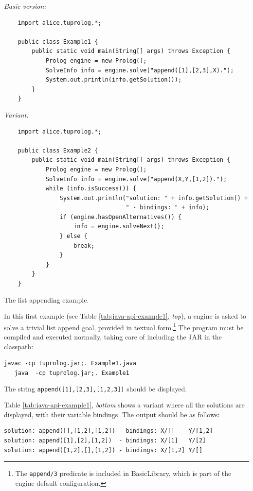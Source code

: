 \begin{table}
\textit{Basic version:}
{\small{
\begin{verbatim}
    import alice.tuprolog.*;

    public class Example1 {
        public static void main(String[] args) throws Exception {
            Prolog engine = new Prolog();
            SolveInfo info = engine.solve("append([1],[2,3],X).");
            System.out.println(info.getSolution());
        }
    }
\end{verbatim}
}}
\textit{Variant:}
{\small{
\begin{verbatim}
    import alice.tuprolog.*;

    public class Example2 {
        public static void main(String[] args) throws Exception {
            Prolog engine = new Prolog();
            SolveInfo info = engine.solve("append(X,Y,[1,2]).");
            while (info.isSuccess()) {
                System.out.println("solution: " + info.getSolution() +
                                   " - bindings: " + info);
                if (engine.hasOpenAlternatives()) {
                    info = engine.solveNext();
                } else {
                    break;
                }
            }
        }
    }
\end{verbatim}
}}
\caption{The list appending example.}
\label{tab:java-api-example1}
\end{table}

In this first example (see Table \ref{tab:java-api-example1}, \textit{top}), a \tuprolog{} engine is asked to solve a trivial list append goal, provided in textual form.\footnote{The \texttt{append/3} predicate is included in BasicLibrary, which is part of the engine default configuration.}
%
The program must be compiled and executed normally, taking care of including the \tuprolog{} JAR in the classpath:

\texttt{javac -cp tuprolog.jar;. Example1.java}\\
\texttt{\mbox{~~~}java~ -cp tuprolog.jar;. Example1}

\noindent The string \texttt{append([1],[2,3],[1,2,3])} should be displayed.

\medskip

\noindent Table \ref{tab:java-api-example1}, \textit{bottom} shows a variant where all the solutions are displayed, with their variable bindings. The output should be as follows:

\begin{verbatim}
solution: append([],[1,2],[1,2]) - bindings: X/[]    Y/[1,2]
solution: append([1],[2],[1,2])  - bindings: X/[1]   Y/[2]
solution: append([1,2],[],[1,2]) - bindings: X/[1,2] Y/[]
\end{verbatim}

